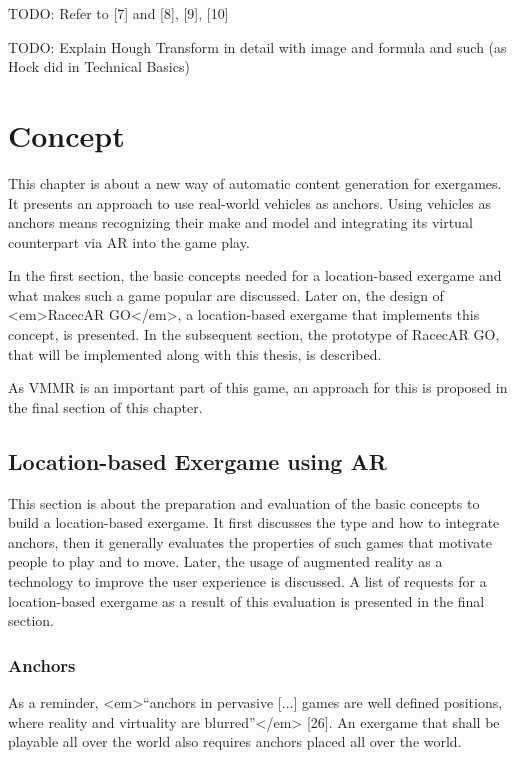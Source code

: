 TODO: Refer to [7] and [8], [9], [10]

TODO: Explain Hough Transform in detail with image and formula and such (as Hock did in Technical Basics)







\chapter{Concept}\label{ch:concept}
This chapter is about a new way of automatic content generation for exergames. It presents an approach to use real-world vehicles as anchors. Using vehicles as anchors means recognizing their make and model and integrating its virtual counterpart via AR into the game play.

In the first section, the basic concepts needed for a location-based exergame and what makes such a game popular are discussed. Later on, the design of <em>RacecAR GO</em>, a location-based exergame that implements this concept, is presented. In the subsequent section, the prototype of RacecAR GO, that will be implemented along with this thesis, is described.

As VMMR is an important part of this game, an approach for this is proposed in the final section of this chapter.


\section{Location-based Exergame using AR}
This section is about the preparation and evaluation of the basic concepts to build a location-based exergame. It first discusses the type and how to integrate anchors, then it generally evaluates the properties of such games that motivate people to play and to move. Later, the usage of augmented reality as a technology to improve the user experience is discussed. A list of requests for a location-based exergame as a result of this evaluation is presented in the final section.

\subsection{Anchors}\label{sec:conceptAnchors}
As a reminder, <em>“anchors in pervasive [...] games are well defined positions, where reality and virtuality are blurred”</em> [26]. An exergame that shall be playable all over the world also requires anchors placed all over the world.

